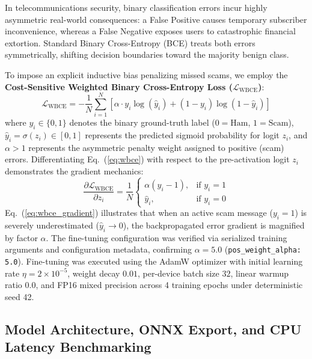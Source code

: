 \documentclass[journal]{IEEEtran}
\begin{document}
In telecommunications security, binary classification errors incur highly asymmetric real-world consequences: a False Positive causes temporary subscriber inconvenience, whereas a False Negative exposes users to catastrophic financial extortion. Standard Binary Cross-Entropy (BCE) treats both errors symmetrically, shifting decision boundaries toward the majority benign class.

To impose an explicit inductive bias penalizing missed scams, we employ the \textbf{Cost-Sensitive Weighted Binary Cross-Entropy Loss ($\mathcal{L}_{\text{WBCE}}$)}:
\begin{equation}
\label{eq:wbce}
\mathcal{L}_{\text{WBCE}} = -\frac{1}{N} \sum_{i=1}^{N} \left[ \alpha \cdot y_i \log(\hat{y}_i) + (1 - y_i) \log(1 - \hat{y}_i) \right]
\end{equation}
where $y_i \in \{0, 1\}$ denotes the binary ground-truth label ($0 = \text{Ham}$, $1 = \text{Scam}$), $\hat{y}_i = \sigma(z_i) \in [0, 1]$ represents the predicted sigmoid probability for logit $z_i$, and $\alpha > 1$ represents the asymmetric penalty weight assigned to positive (scam) errors. Differentiating Eq.~(\ref{eq:wbce}) with respect to the pre-activation logit $z_i$ demonstrates the gradient mechanics:
\begin{equation}
\label{eq:wbce_gradient}
\frac{\partial \mathcal{L}_{\text{WBCE}}}{\partial z_i} = \frac{1}{N} \begin{cases} 
\alpha (\hat{y}_i - 1), & \text{if } y_i = 1 \\ 
\hat{y}_i, & \text{if } y_i = 0 
\end{cases}
\end{equation}
Eq.~(\ref{eq:wbce_gradient}) illustrates that when an active scam message ($y_i = 1$) is severely underestimated ($\hat{y}_i \to 0$), the backpropagated error gradient is magnified by factor $\alpha$. The fine-tuning configuration was verified via serialized training arguments and configuration metadata, confirming $\alpha = 5.0$ (\texttt{pos\_weight\_alpha: 5.0}). Fine-tuning was executed using the AdamW optimizer with initial learning rate $\eta = 2 \times 10^{-5}$, weight decay $0.01$, per-device batch size $32$, linear warmup ratio $0.0$, and FP16 mixed precision across 4 training epochs under deterministic seed 42.

\subsection{Model Architecture, ONNX Export, and CPU Latency Benchmarking}
\label{subsec:onnx}
\end{document}

